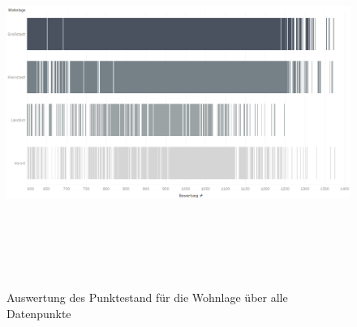 \documentclass[a4paper,12pt]{report}
\begin{document}
\begin{figure}[!h]
    \centering
    \includegraphics[width=16cm,height=12cm]{Diagramme/SZ2_Tab12.PNG}
    \caption{Auswertung des Punktestand für die Wohnlage über alle Datenpunkte}
    \label{fig:SZ2Tab12}
\end{figure}
\end{document}
